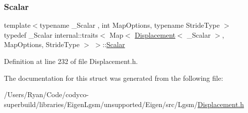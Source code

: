 \subsubsection{\texorpdfstring{Scalar}{Scalar}}
{\footnotesize\ttfamily template$<$typename \+\_\+\+Scalar , int Map\+Options, typename Stride\+Type $>$ \\
typedef \+\_\+\+Scalar internal\+::traits$<$ Map$<$ \hyperlink{class_displacement}{Displacement}$<$ \+\_\+\+Scalar $>$, Map\+Options, Stride\+Type $>$ $>$\+::\hyperlink{structinternal_1_1traits_3_01_map_3_01_displacement_3_01___scalar_01_4_00_01_map_options_00_01_stride_type_01_4_01_4_af622b2eb414fa4600a591d0b6ae51f8d}{Scalar}}



Definition at line 232 of file Displacement.\+h.



The documentation for this struct was generated from the following file\+:\begin{DoxyCompactItemize}
\item 
/\+Users/\+Ryan/\+Code/codyco-\/superbuild/libraries/\+Eigen\+Lgsm/unsupported/\+Eigen/src/\+Lgsm/\hyperlink{_displacement_8h}{Displacement.\+h}\end{DoxyCompactItemize}
